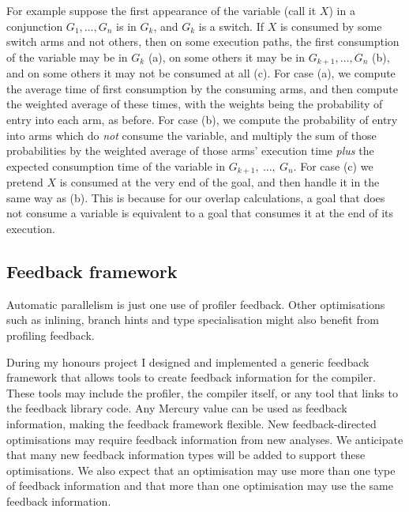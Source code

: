 For example
suppose the first appearance of the variable (call it $X$)
in a conjunction $G_1, \ldots, G_n$ is in $G_k$, and $G_k$ is a switch.
If $X$ is consumed by some switch arms and not others,
then on some execution paths,
the first consumption of the variable may be in $G_k$ (a),
on some others it may be in $G_{k+1}, \ldots, G_n$ (b),
and on some others it may not be consumed at all (c).
For case (a),
we compute the average time of first consumption by the consuming arms,
and then compute the weighted average of these times,
with the weights being the probability of entry into each arm, as before.
For case (b), we compute the probability of entry
into arms which do \emph{not} consume the variable,
and multiply the sum of those probabilities
by the weighted average of those arms' execution time
\emph{plus} the expected consumption time of the variable
in $G_{k+1},~\ldots,~G_n$.
For case (c)
we pretend $X$ is consumed at the very end of the goal,
and then handle it in the same way as (b).
This is because for our overlap calculations,
a goal that does not consume a variable is equivalent to
a goal that consumes it at the end of its execution.

\subsection{Feedback framework}
\label{sec:feedback}

Automatic parallelism is just one use of profiler feedback.
Other optimisations
such as inlining,
branch hints
and type specialisation
might also benefit from profiling feedback.

During my honours project I designed and implemented a generic feedback
framework that allows tools to create feedback information for the compiler.
These tools may include the profiler, the compiler itself,
or any tool that links to the feedback library code.
Any Mercury value can be used as feedback information,
making the feedback framework flexible.
New feedback-directed optimisations may require feedback information
from new analyses.
We anticipate that many new feedback information types will be added to
support these optimisations.
We also expect that an optimisation may use more than one type of
feedback information and that more than one optimisation may use the
same feedback information.

